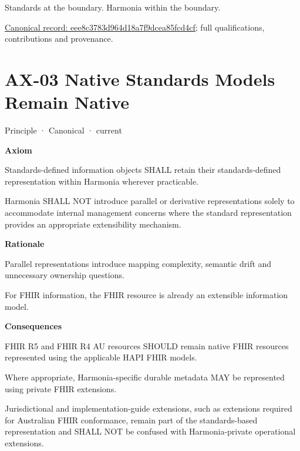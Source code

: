 Standards at the boundary. Harmonia within the boundary.


{\footnotesize \href{../../../../continuum/motivation/principle/eee8c3783d964d18a7f9dcea85fcd4cf.md}{Canonical record: eee8c3783d964d18a7f9dcea85fcd4cf}; full qualifications, contributions and provenance.}\par
\section{AX-03 Native Standards Models Remain Native}

\label{element:e99a4e2bf99f476d876394300d6b9c3d}
{\small Principle · Canonical · current}\par

\par\medskip\textbf{Axiom}\par


Standards-defined information objects SHALL retain their
standards-defined representation within Harmonia wherever practicable.



Harmonia SHALL NOT introduce parallel or derivative representations
solely to accommodate internal management concerns where the standard
representation provides an appropriate extensibility mechanism.



\par\medskip\textbf{Rationale}\par


Parallel representations introduce mapping complexity, semantic drift
and unnecessary ownership questions.



For FHIR information, the FHIR resource is already an extensible
information model.



\par\medskip\textbf{Consequences}\par


FHIR R5 and FHIR R4 AU resources SHOULD remain native FHIR resources
represented using the applicable HAPI FHIR models.



Where appropriate, Harmonia-specific durable metadata MAY be represented
using private FHIR extensions.



Jurisdictional and implementation-guide extensions, such as extensions
required for Australian FHIR conformance, remain part of the
standards-based representation and SHALL NOT be confused with
Harmonia-private operational extensions.



